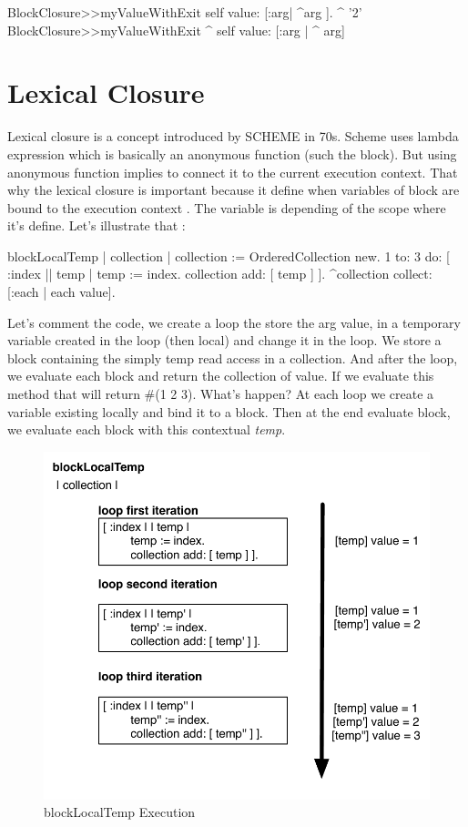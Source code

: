 \documentclass[a4paper,10pt,twoside]{book}
\begin{document}
\begin{code}{}
BlockClosure>>myValueWithExit
	      self value: [:arg| ^arg ].
      ^ '2'
BlockClosure>>myValueWithExit
 ^ self value: [:arg | ^ arg]        
\end{code}


\section{Lexical Closure}


Lexical closure is a concept introduced by SCHEME in 70s. Scheme uses lambda expression which is basically an anonymous function (such the block). But using anonymous function implies to connect it to the current execution context. That why the lexical closure is important because it define when variables of block are bound to the execution context . The variable is depending of the scope where it's  define. Let's illustrate that :

\begin{code}{}
blockLocalTemp
	| collection |
		collection := OrderedCollection new.
		1 to: 3 do: [ :index || temp |
			temp := index. 
			collection add: [ temp ] ].
		^collection collect: [:each | each value].
\end{code}

Let's  comment the code, we create a loop the store the arg value, in a temporary variable created in the loop (then local) and change it in the loop. We store a block containing the simply temp read access in a collection. And after the loop, we evaluate each block and return the collection of value.
If we evaluate this method that will return \#(1 2 3). What's happen? At each loop we create a variable existing locally and bind it to a block. Then at the end evaluate block, we evaluate each block with this contextual \emph{temp}. 

\begin{figure}[htbp]
	\centering
        \includegraphics[width=0.7\linewidth]{blockClosureLocalTemp}
	\caption{blockLocalTemp Execution}
	\label{fig:blockLocalTempExecution}
\end{figure}
\end{document}
